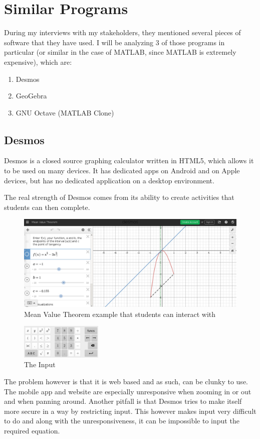 \documentclass[../../../main.tex]{subfiles}
\begin{document}
\chapter{Similar Programs}
During my interviews with my stakeholders, they mentioned several pieces of software that they have used. I will be analyzing 3 of those programs in particular (or similar in the case of MATLAB, since MATLAB is extremely expensive), which are:
\begin{enumerate}
\item Desmos \cite{desmos}
\item GeoGebra \cite{geogebra}
\item GNU Octave\cite{octave} (MATLAB\cite{matlab} Clone)
\end{enumerate}

\section{Desmos}
Desmos is a closed source graphing calculator written in HTML5, which allows it to be used on many devices. It has dedicated apps on Android and on Apple devices, but has no dedicated application on a desktop environment.

The real strength of Desmos comes from its ability to create activities that students can then complete.
\begin{figure}[H]
	\includegraphics[width=\textwidth]{images/desmosDemo}
	\caption{Mean Value Theorem example that students can interact with}
\end{figure}
\begin{figure}
	\includegraphics[width=0.35\textwidth]{images/desmosMobile}
	\caption{The Input}
\end{figure}
The problem however is that it is web based and as such, can be clunky to use. The mobile app and website are especially unresponsive when zooming in or out and when panning around. Another pitfall is that Desmos tries to make itself more secure in a way by restricting input. This however makes input very difficult to do and along with the unresponsiveness, it can be impossible to input the required equation.
\end{document}
